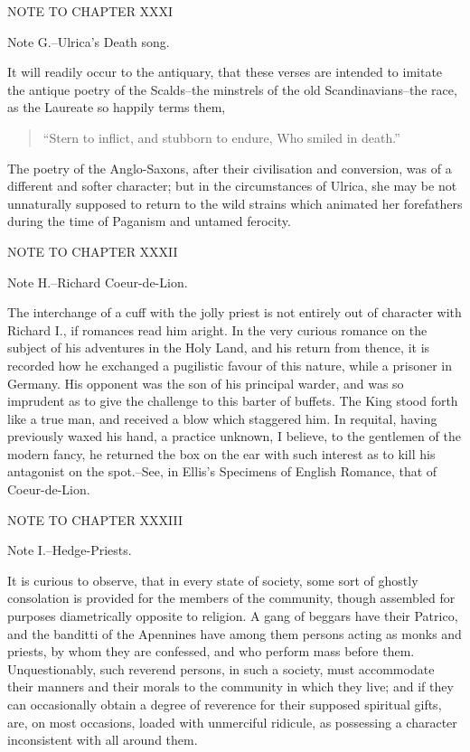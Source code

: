 NOTE TO CHAPTER XXXI

Note G.--Ulrica's Death song.

It will readily occur to the antiquary, that these verses are intended
to imitate the antique poetry of the Scalds--the minstrels of the old
Scandinavians--the race, as the Laureate so happily terms them,

\begin{quote}
``Stern to inflict, and stubborn to endure,
Who smiled in death.''
\end{quote}

The poetry of the Anglo-Saxons, after their civilisation and conversion,
was of a different and softer character; but in the circumstances of
Ulrica, she may be not unnaturally supposed to return to the wild
strains which animated her forefathers during the time of Paganism and
untamed ferocity.

NOTE TO CHAPTER XXXII

Note H.--Richard Coeur-de-Lion.

The interchange of a cuff with the jolly priest is not entirely out of
character with Richard I., if romances read him aright. In the very
curious romance on the subject of his adventures in the Holy Land, and
his return from thence, it is recorded how he exchanged a pugilistic
favour of this nature, while a prisoner in Germany. His opponent was the
son of his principal warder, and was so imprudent as to give the
challenge to this barter of buffets. The King stood forth like a true
man, and received a blow which staggered him. In requital, having
previously waxed his hand, a practice unknown, I believe, to the
gentlemen of the modern fancy, he returned the box on the ear with such
interest as to kill his antagonist on the spot.--See, in Ellis's
Specimens of English Romance, that of Coeur-de-Lion.

NOTE TO CHAPTER XXXIII

Note I.--Hedge-Priests.

It is curious to observe, that in every state of society, some sort of
ghostly consolation is provided for the members of the community, though
assembled for purposes diametrically opposite to religion. A gang of
beggars have their Patrico, and the banditti of the Apennines have among
them persons acting as monks and priests, by whom they are confessed,
and who perform mass before them. Unquestionably, such reverend persons,
in such a society, must accommodate their manners and their morals to
the community in which they live; and if they can occasionally obtain a
degree of reverence for their supposed spiritual gifts, are, on most
occasions, loaded with unmerciful ridicule, as possessing a character
inconsistent with all around them.

